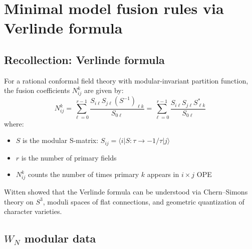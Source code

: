 

\section{Minimal model fusion rules via Verlinde formula}
\label{sec:minimal-model-fusion}

\subsection{Recollection: Verlinde formula}
\label{subsec:verlinde-formula-recall}

\begin{theorem}\label{thm:verlinde-general}
For a rational conformal field theory with modular-invariant partition function, 
the fusion coefficients $N_{ij}^k$ are given by:
\begin{equation}
N_{ij}^k = \sum_{\ell=0}^{r-1} \frac{S_{i\ell} S_{j\ell} (S^{-1})_{\ell k}}{S_{0\ell}}
= \sum_{\ell=0}^{r-1} \frac{S_{i\ell} S_{j\ell} S_{\ell k}^*}{S_{0\ell}}
\end{equation}
where:
\begin{itemize}
\item $S$ is the modular S-matrix: $S_{ij} = \langle i | S: \tau \to -1/\tau | j \rangle$
\item $r$ is the number of primary fields
\item $N_{ij}^k$ counts the number of times primary $k$ appears in $i \times j$ OPE
\end{itemize}
\end{theorem}

\begin{remark}\label{rem:witten-verlinde}
Witten showed that the Verlinde formula can be understood via Chern--Simons theory on $S^3$, moduli spaces of flat connections, and geometric quantization of character varieties.
\end{remark}

\subsection{\texorpdfstring{$W_N$ modular data}{W N modular data}}
\label{subsec:wn-modular-data}

